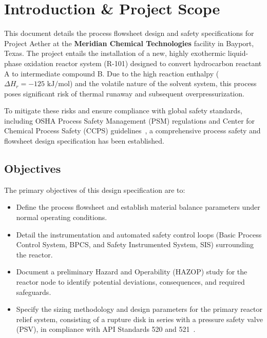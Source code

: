 \section{Introduction \& Project Scope}
\label{sec:intro}

This document details the process flowsheet design and safety specifications for Project Aether at the \textbf{Meridian Chemical Technologies} facility in Bayport, Texas. The project entails the installation of a new, highly exothermic liquid-phase oxidation reactor system (R-101) designed to convert hydrocarbon reactant A to intermediate compound B. Due to the high reaction enthalpy ($\Delta H_r = -125 \text{ kJ/mol}$) and the volatile nature of the solvent system, this process poses significant risk of thermal runaway and subsequent overpressurization.

To mitigate these risks and ensure compliance with global safety standards, including OSHA Process Safety Management (PSM) regulations and Center for Chemical Process Safety (CCPS) guidelines~\cite{ccps2010, crowl2019}, a comprehensive process safety and flowsheet design specification has been established.

\subsection{Objectives}
The primary objectives of this design specification are to:
\begin{itemize}
    \item Define the process flowsheet and establish material balance parameters under normal operating conditions.
    \item Detail the instrumentation and automated safety control loops (Basic Process Control System, BPCS, and Safety Instrumented System, SIS) surrounding the reactor.
    \item Document a preliminary Hazard and Operability (HAZOP) study for the reactor node to identify potential deviations, consequences, and required safeguards.
    \item Specify the sizing methodology and design parameters for the primary reactor relief system, consisting of a rupture disk in series with a pressure safety valve (PSV), in compliance with API Standards 520 and 521~\cite{api520, api521}.
\end{itemize}

